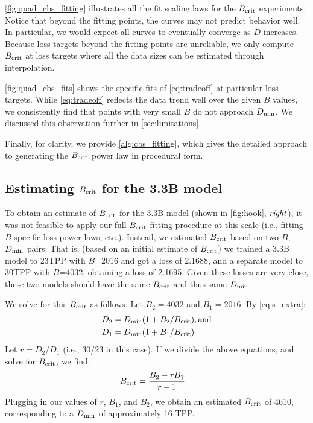 

\cref{fig:quad_cbs_fitting} illustrates all the fit scaling laws for
the $B_{\text{crit}}$ experiments.  Notice that beyond the fitting points, the
curves may not predict behavior well.
%
In particular, we would expect all curves to eventually converge as
$D$ increases.  Because loss targets beyond the fitting points are
unreliable, we only compute $B_{\text{crit}}$ at loss targets where all the data
sizes can be estimated through interpolation.



\cref{fig:quad_cbs_fits} shows the specific fits of \cref{eq:tradeoff}
at particular loss targets.  While \cref{eq:tradeoff} reflects the
data trend well over the given $B$ values, we consistently find that
points with very small $B$ do not approach $D_{\text{min}}$.  We discussed this
observation further in \cref{sec:limitations}.



Finally, for clarity, we provide \cref{alg:cbs_fitting}, which gives
the detailed approach to generating the $B_{\text{crit}}$ power law in procedural
form.

\subsection{Estimating $B_{\text{crit}}$ for the 3.3B model}

To obtain an estimate of $B_{\text{crit}}$ for the 3.3B model (shown in
\cref{fig:hook}, $\text{\emph{right}}$), it was not feasible to apply our full
$B_{\text{crit}}$ fitting procedure at this scale (i.e., fitting $B$-specific
loss power-laws, etc.).
%
Instead, we estimated $B_{\text{crit}}$ based on two $B$, $D_{\text{min}}$ pairs.
%
That is, (based on an initial estimate of $B_{\text{crit}}$) we trained a 3.3B
model to 23TPP with $B$=2016 and got a loss of 2.1688, and a separate
model to 30TPP with $B$=4032, obtaining a loss of 2.1695.
%
Given these losses are very close, these two models should have the
same $B_{\text{crit}}$ and thus same $D_{\text{min}}$.

We solve for this $B_{\text{crit}}$ as follows.  Let $B_2 = 4032$ and $B_1 = 2016$.  By \cref{eq:s_extra}:
\begin{align*}
  D_2 &= D_{\text{min}}(1 + B_2/B_{\text{crit}}), \text{and} \\
  D_1 &= D_{\text{min}}(1 + B_1/B_{\text{crit}})
\end{align*}
Let $r = D_2/D_1$ (i.e., 30/23 in this case).  If we divide the above
equations, and solve for $B_{\text{crit}}$, we find:
\begin{align*}
  B_{\text{crit}} &= \frac{B_2 - r B_1}{r - 1}
\end{align*}
Plugging in our values of $r$, $B_1$, and $B_2$, we obtain an
estimated $B_{\text{crit}}$ of 4610, corresponding to a $D_{\text{min}}$ of
approximately 16 TPP\@.

